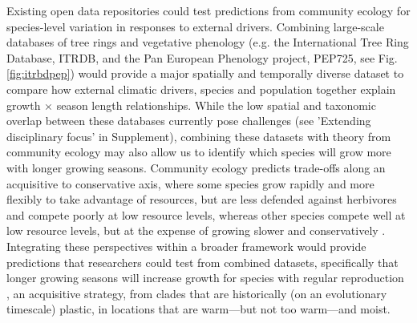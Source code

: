 \documentclass[11pt]{article}
\begin{document}

Existing open data repositories could test predictions from community ecology for species-level variation in responses to external drivers. Combining large-scale databases of tree rings and vegetative phenology (e.g. the International Tree Ring Database, ITRDB, and the Pan European Phenology project, PEP725, see Fig. \ref{fig:itrbdpep}) would provide a major spatially and temporally diverse dataset to compare how external climatic drivers, species and population together explain growth $\times$ season length relationships. While the low spatial and taxonomic overlap between these databases currently pose challenges (see 'Extending disciplinary focus' in Supplement), combining these datasets with theory from community ecology may also allow us to identify which species will grow more with longer growing seasons. Community ecology predicts trade-offs along an acquisitive to conservative axis, where some species grow rapidly and more flexibly to take advantage of resources, but are less defended against herbivores and compete poorly at low resource levels, whereas other species compete well at low resource levels, but at the expense of growing slower and conservatively \citep[][]{Grime:1977sw}. Integrating these perspectives within a broader framework would provide predictions that researchers could test from combined datasets, specifically that longer growing seasons will increase growth for species with regular reproduction \citep[no masting, see also new masting database in][]{hacket2022mastree+}, an acquisitive strategy, from clades that are historically (on an evolutionary timescale) plastic, in locations that are warm---but not too warm---and moist. 
\end{document}
